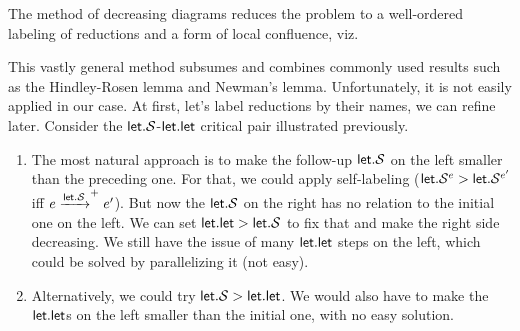 \documentclass[a4paper, 11pt,titlepage, openright, twoside]{report}
\newcommand{\keyword}[1]{\textsf{\textup{#1}}}
\newcommand{\KwLet}{\keyword{let}}
\renewcommand{\S}{\mathcal{S}}
\newcommand{\+}{\enspace}
\begin{document}
The method of decreasing diagrams \cite{dd} reduces the problem to a well-ordered
labeling of reductions and a form of local confluence, viz.
\begin{center}
\end{center}
This vastly general method subsumes and combines commonly used results such as the Hindley-Rosen lemma and Newman's lemma.
Unfortunately, it is not easily applied in our case.
At first, let's label reductions by their names,
we can refine later.
Consider the $\KwLet{}.\S$-$\KwLet{}.\KwLet{}$ critical pair illustrated previously.
\begin{enumerate}
	\item
		The most natural approach
		is to make the follow-up $\KwLet{}.\S$ on the left smaller than the preceding one.
		For that, we could apply self-labeling
		($\KwLet{}.\S^e > \KwLet{}.\S^{e'}$ iff $e \xrightarrow{\KwLet{}.\S}^+ e'$).
		But now the $\KwLet{}.\S$ on the right has no relation to the initial one on the left.
		We can set $\KwLet{}.\KwLet{} > \KwLet{}.\S$ to fix that and make the right side decreasing.
		We still have the issue of many $\KwLet{}.\KwLet{}$ steps on the left,
		which could be solved by parallelizing it (not easy).
	\item
		Alternatively, we could try $\KwLet{}.\S > \KwLet{}.\KwLet{}$.
		We would also have to make the $\KwLet{}.\KwLet{}$s on the left smaller than the initial one,
		with no easy solution.
\end{enumerate}
\end{document}
